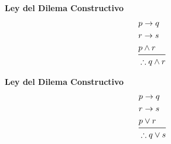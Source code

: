 \documentclass[12pt, fleqn]{report}                             %
\theoremstyle{break}                                            %
\begin{document}
            \begin{multicols}{2}
                
                \large{\textbf{Ley del Dilema Constructivo}}
                    \begin{equation*}
                    \begin{split}
                        &p \to q             \\
                        &r \to s             \\
                        &p \land r           \\
                        \midrule
                        &\therefore q \land r
                    \end{split}
                    \end{equation*}

                \large{\textbf{Ley del Dilema Constructivo}}
                    \begin{equation*}
                    \begin{split}
                        &p \to q             \\
                        &r \to s             \\
                        &p \lor r            \\
                        \midrule
                        &\therefore q \lor s
                    \end{split}
                    \end{equation*}

            \end{multicols}

            \bigskip
\end{document}
